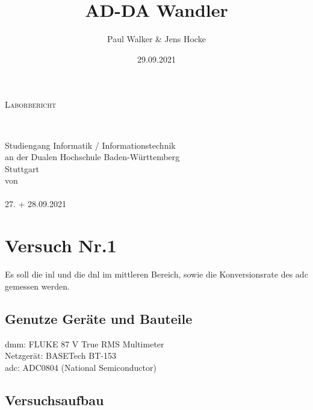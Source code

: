 \documentclass[12pt, a4paper, ngerman]{article}
\title{AD-DA Wandler}
\author{Paul Walker \& Jens Hocke}
\date{29.09.2021}
\newcommand{\Was}{Laborbericht}
\newcommand{\Studiengang}{Informatik / Informationstechnik}
\begin{document}
\makeatletter
\begin{titlepage}
  \begin{center}
    \vspace*{1cm}
    {\Huge\scshape \Was}\\[2cm]
    \begin{center}
      \linespread{1}\Huge \@title\\[2cm]
    \end{center}
    {\large Studiengang \Studiengang}\\
    {\large an der Dualen Hochschule Baden-Württemberg\\ Stuttgart}\\[2cm]
    {\large von}\\
    {\large\bfseries \@author}\\ [1cm]
    {\large 27. + 28.09.2021}
    \vfill
  \end{center}
\end{titlepage}
\makeatother

\tableofcontents

\newpage
\thispagestyle{simple}
\printacronyms[name=Abkürzungsverzeichnis, heading=section*]
\newpage

\section{Versuch Nr.1}

Es soll die \ac{inl} und die \ac{dnl} im mittleren Bereich,
sowie die Konversionsrate des \ac{adc} gemessen werden.

\subsection{Genutze Geräte und Bauteile}

\ac{dmm}: FLUKE 87 V True RMS Multimeter \\
Netzgerät: BASETech BT-153 \\
\ac{adc}: ADC0804 (National Semiconductor)

\subsection{Versuchsaufbau}
\end{document}
